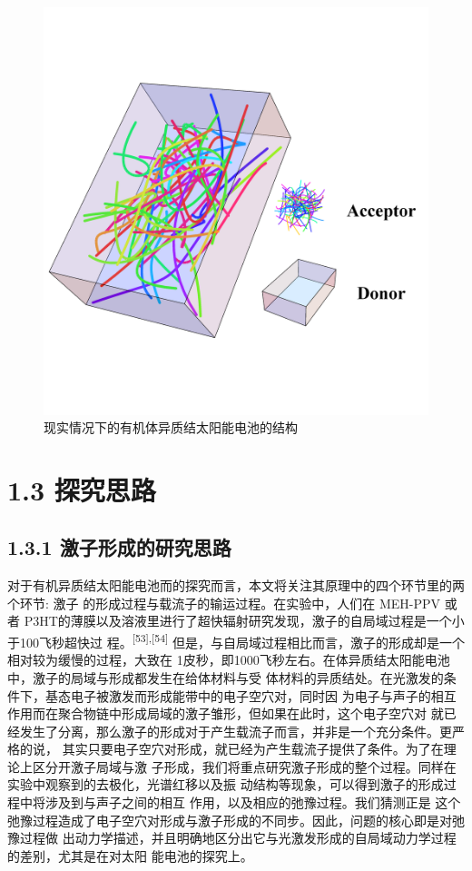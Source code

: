 \documentclass[12pt,]{report}
\begin{document}
\begin{figure}[h!]
    \centering
    \includegraphics[scale=0.8]{./figures/solar3d.png}
    \caption{现实情况下的有机体异质结太阳能电池的结构}
    \label{fig:solar3d}
\end{figure}

\section{1.3 探究思路}\label{ux63a2ux7a76ux601dux8def}

\subsection{1.3.1
激子形成的研究思路}\label{ux6fc0ux5b50ux5f62ux6210ux7684ux7814ux7a76ux601dux8def}

对于有机异质结太阳能电池而的探究而言，本文将关注其原理中的四个环节里的两个环节:
激子 的形成过程与载流子的输运过程。在实验中，人们在 MEH-PPV 或者
P3HT的薄膜以及溶液里进行了超快辐射研究发现，激子的自局域过程是一个小于100飞秒超快过
程。\textsuperscript{{[}53{]},{[}54{]}}
但是，与自局域过程相比而言，激子的形成却是一个相对较为缓慢的过程，大致在
1皮秒，即1000飞秒左右。在体异质结太阳能电池中，激子的局域与形成都发生在给体材料与受
体材料的异质结处。在光激发的条件下，基态电子被激发而形成能带中的电子空穴对，同时因
为电子与声子的相互作用而在聚合物链中形成局域的激子雏形，但如果在此时，这个电子空穴对
就已经发生了分离，那么激子的形成对于产生载流子而言，并非是一个充分条件。更严格的说，
其实只要电子空穴对形成，就已经为产生载流子提供了条件。为了在理论上区分开激子局域与激
子形成，我们将重点研究激子形成的整个过程。同样在实验中观察到的去极化，光谱红移以及振
动结构等现象，可以得到激子的形成过程中将涉及到与声子之间的相互
作用，以及相应的弛豫过程。我们猜测正是
这个弛豫过程造成了电子空穴对形成与激子形成的不同步。因此，问题的核心即是对弛豫过程做
出动力学描述，并且明确地区分出它与光激发形成的自局域动力学过程的差别，尤其是在对太阳
能电池的探究上。
\end{document}
